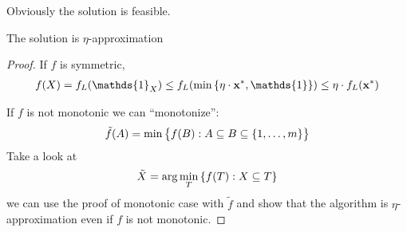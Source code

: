  Obviously the solution is feasible.
 \begin{prop}
 	The solution is $\eta$-approximation
 	\begin{proof}
 		If $f$ is symmetric,
 		\begin{align}
 		f(X) = f_L(\mathds{1}_X) \leq f_L\qty( \min \qty{ \eta \cdot \vb{x}^*, \mathds{1} }) \leq \eta \cdot f_L(\vb{x}^*)
 		\end{align}
 		
 		If $f$ is not monotonic we can ``monotonize'':
 		\begin{align}
 		\tilde{f}(A) = \min \qty\big{f(B): A\subseteq B \subseteq \qty{1, \dots, m}}
 		\end{align}
 		Take a look at
 		\begin{align}
 		\tilde{X} = \arg \min\limits_T \qty{f(T) : X\subseteq T}
 		\end{align}
 		we can use the proof of monotonic case with $\tilde{f}$ and show that the algorithm is $\eta$-approximation even if $f$ is not monotonic.
 	\end{proof}
 \end{prop}